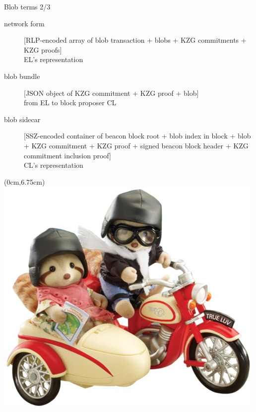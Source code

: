\documentclass[10pt]{beamer}
\begin{document}
\begin{frame}[fragile]{Blob terms 2/3}
\begin{description}
  \item[network form] [RLP-encoded array of blob transaction + blobs +
    KZG commitments + KZG proofs] \\ EL's representation
  \item[blob bundle] [JSON object of KZG commitment + KZG proof + blob] \\
    from EL to block proposer CL
  \item[blob sidecar] [SSZ-encoded container of beacon block root +
    blob index in block + blob + KZG commitment + KZG proof +
    signed beacon block header + KZG commitment inclusion proof] \\
    CL's representation
\end{description}
\begin{textblock*}{10cm}(0cm,6.75cm)
\includegraphics[trim={0 0 0 0},clip,scale=0.18]{sylvanian-families-sidecar.jpg}
\end{textblock*}
\end{frame}
\end{document}
